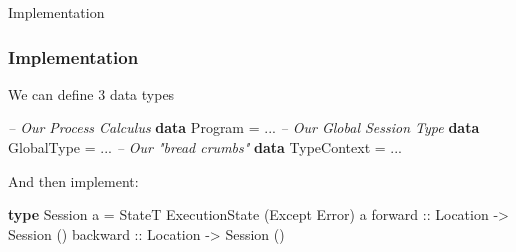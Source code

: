 \documentclass[12pt]{beamer}
\newenvironment{Shaded}{}{}
\newcommand{\KeywordTok}[1]{\textcolor[rgb]{0.00,0.44,0.13}{\textbf{#1}}}
\newcommand{\DataTypeTok}[1]{\textcolor[rgb]{0.56,0.13,0.00}{#1}}
\newcommand{\CommentTok}[1]{\textcolor[rgb]{0.38,0.63,0.69}{\textit{#1}}}
\newcommand{\OtherTok}[1]{\textcolor[rgb]{0.00,0.44,0.13}{#1}}
\newcommand{\FunctionTok}[1]{\textcolor[rgb]{0.02,0.16,0.49}{#1}}
\newcommand{\NormalTok}[1]{#1}
\begin{document}
\begin{frame}
\begin{center}
    \LARGE{Implementation} 
\end{center}
\end{frame}



\begin{frame}[fragile]
\frametitle{Implementation}
    We can define 3 data types 
    \begin{Shaded}
        \begin{Highlighting}[]
            \CommentTok{-- Our Process Calculus}
            \KeywordTok{data} \DataTypeTok{Program} \FunctionTok{=} \NormalTok{...} 
            \CommentTok{-- Our Global Session Type} 
            \KeywordTok{data} \DataTypeTok{GlobalType} \FunctionTok{=} \NormalTok{...} 
            \CommentTok{-- Our "bread crumbs"} 
            \KeywordTok{data} \DataTypeTok{TypeContext} \FunctionTok{=} \NormalTok{...} 
        \end{Highlighting}
    \end{Shaded}
    And then implement:
    \begin{Shaded}
        \begin{Highlighting}[]
            \KeywordTok{type} \DataTypeTok{Session} \NormalTok{a }\FunctionTok{=} \DataTypeTok{StateT} \DataTypeTok{ExecutionState} \NormalTok{(}\DataTypeTok{Except} \DataTypeTok{Error}\NormalTok{) a}
            \OtherTok{forward  ::} \DataTypeTok{Location} \OtherTok{->} \DataTypeTok{Session} \NormalTok{()}
            \OtherTok{backward ::} \DataTypeTok{Location} \OtherTok{->} \DataTypeTok{Session} \NormalTok{()}
        \end{Highlighting}
    \end{Shaded}

\end{frame}
\end{document}

